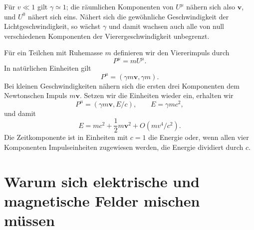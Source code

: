 Für \(v\ll1\) gilt \(\gamma\simeq1\); die räumlichen Komponenten von \(U^\mu\) nähern sich also \(\boldsymbol v\), und \(U^0\) nähert sich eins. Nähert sich die gewöhnliche Geschwindigkeit der Lichtgeschwindigkeit, so wächst \(\gamma\) und damit wachsen auch alle von null verschiedenen Komponenten der Vierergeschwindigkeit unbegrenzt.

\begin{classroomqa}
\end{classroomqa}

Für ein Teilchen mit Ruhemasse \(m\) definieren wir den Viererimpuls durch \begin{equation}
  P^\mu=mU^\mu.
\end{equation} In natürlichen Einheiten gilt \begin{equation}
  P^\mu=(\gamma m\boldsymbol v,\gamma m).
\end{equation} Bei kleinen Geschwindigkeiten nähern sich die ersten drei Komponenten dem Newtonschen Impuls \(m\boldsymbol v\). Setzen wir die Einheiten wieder ein, erhalten wir \begin{equation}
  P^\mu=(\gamma m\boldsymbol v,E/c),
  \qquad E=\gamma mc^2,
\end{equation} und damit \begin{equation}
  E=mc^2+\frac{1}{2}m\boldsymbol v^2+O(mv^4/c^2).
\end{equation} Die Zeitkomponente ist in Einheiten mit \(c=1\) die Energie oder, wenn allen vier Komponenten Impulseinheiten zugewiesen werden, die Energie dividiert durch \(c\).

\begin{classroomqa}
\end{classroomqa}

\section{Warum sich elektrische und magnetische Felder mischen müssen}

